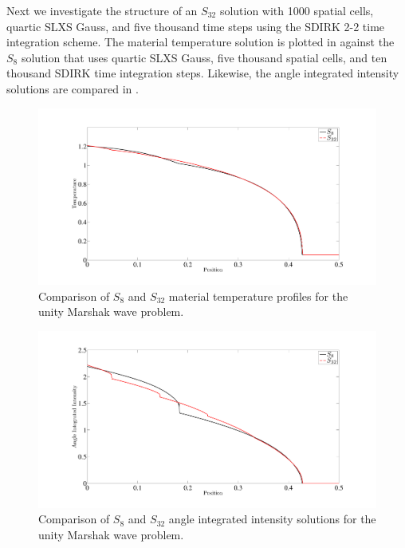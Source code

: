 Next we investigate the structure of an $S_{32}$ solution with 1000 spatial cells, quartic SLXS Gauss, and five thousand time steps using the SDIRK 2-2 time integration scheme.
The material temperature solution is plotted in  against the $S_8$ solution that uses quartic SLXS Gauss,  five thousand spatial cells, and ten thousand SDIRK time integration steps.
Likewise, the angle integrated intensity solutions are compared in .
\begin{figure}[!htp]
\centering
\includegraphics[width=16cm,trim=1.5in  0.2in 0.5in 0.75in,clip=true]{chapter6_grey_radtran/Dissertation_Data/S8_vs_S32_Material_Temperature.pdf}
\caption{Comparison of $S_8$ and $S_{32}$ material temperature profiles for the unity Marshak wave problem.}
\label{fig:s8_vs_s32_temperature}
\end{figure}
%
%
\begin{figure}[!htp]
\centering
\includegraphics[width=16cm,trim=1.5in  0.2in 0.5in 0.75in,clip=true]{chapter6_grey_radtran/Dissertation_Data/S8_vs_S32_Radiation.pdf}
\caption{Comparison of $S_8$ and $S_{32}$ angle integrated intensity solutions for the unity Marshak wave problem.}
\label{fig:s8_vs_s32_radiation}
\end{figure}

